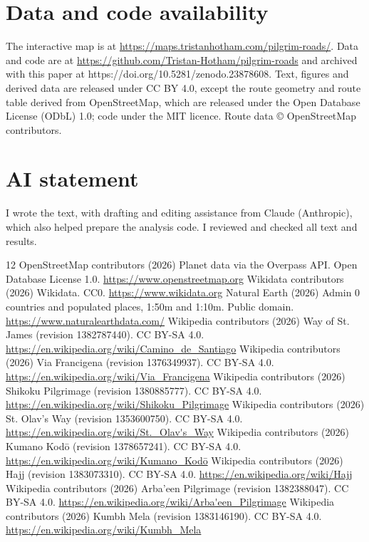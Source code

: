 \documentclass[11pt,a4paper]{article}
\begin{document}
\section*{Data and code availability}
The interactive map is at \url{https://maps.tristanhotham.com/pilgrim-roads/}. Data and code are at \url{https://github.com/Tristan-Hotham/pilgrim-roads} and archived with this paper at https://doi.org/10.5281/zenodo.23878608. Text, figures and derived data are released under CC BY 4.0, except the route geometry and route table derived from OpenStreetMap, which are released under the Open Database License (ODbL) 1.0; code under the MIT licence. Route data © OpenStreetMap contributors.

\section*{AI statement}
I wrote the text, with drafting and editing assistance from Claude (Anthropic), which also helped prepare the analysis code. I reviewed and checked all text and results.

\begin{thebibliography}{12}
 OpenStreetMap contributors (2026) Planet data via the Overpass API. Open Database License 1.0. \url{https://www.openstreetmap.org}
 Wikidata contributors (2026) Wikidata. CC0. \url{https://www.wikidata.org}
 Natural Earth (2026) Admin 0 countries and populated places, 1:50m and 1:10m. Public domain. \url{https://www.naturalearthdata.com/}
 Wikipedia contributors (2026) Way of St. James (revision 1382787440). CC BY-SA 4.0. \url{https://en.wikipedia.org/wiki/Camino_de_Santiago}
 Wikipedia contributors (2026) Via Francigena (revision 1376349937). CC BY-SA 4.0. \url{https://en.wikipedia.org/wiki/Via_Francigena}
 Wikipedia contributors (2026) Shikoku Pilgrimage (revision 1380885777). CC BY-SA 4.0. \url{https://en.wikipedia.org/wiki/Shikoku_Pilgrimage}
 Wikipedia contributors (2026) St. Olav's Way (revision 1353600750). CC BY-SA 4.0. \url{https://en.wikipedia.org/wiki/St._Olav's_Way}
 Wikipedia contributors (2026) Kumano Kodō (revision 1378657241). CC BY-SA 4.0. \url{https://en.wikipedia.org/wiki/Kumano_Kodō}
 Wikipedia contributors (2026) Hajj (revision 1383073310). CC BY-SA 4.0. \url{https://en.wikipedia.org/wiki/Hajj}
 Wikipedia contributors (2026) Arba'een Pilgrimage (revision 1382388047). CC BY-SA 4.0. \url{https://en.wikipedia.org/wiki/Arba'een_Pilgrimage}
 Wikipedia contributors (2026) Kumbh Mela (revision 1383146190). CC BY-SA 4.0. \url{https://en.wikipedia.org/wiki/Kumbh_Mela}
\end{thebibliography}
\end{document}
